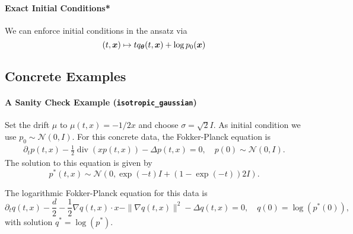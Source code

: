 \paragraph{Exact Initial Conditions*}
We can enforce initial conditions in the ansatz via 
\begin{equation*}
    (t,{\bm{x}}) \mapsto t q_{\bm{\theta}}(t, {\bm{x}}) + \log p_0({\bm{x}})
\end{equation*}

\subsection{Concrete Examples}
\paragraph{A Sanity Check Example (\texttt{isotropic\_gaussian})}
Set the drift $\mu$ to $\mu(t,x) = -1/2x$ and choose $\sigma=\sqrt 2 I$. As initial condition we use $p_0 \sim \mathcal N(0,I)$. For this concrete data, the Fokker-Planck equation is
\begin{align}\label{eq:fokker_planck_sanity_example}
    \partial_t p(t, x)
    -
    \frac12 \operatorname{div}(xp(t,x))
    -
    \Delta p(t,x)
    =
    0,
    \quad 
    p(0) \sim \mathcal N(0, I).
\end{align}
The solution to this equation is given by
\begin{equation}
    p^*(t, x) \sim \mathcal N(0, \exp(-t)I + (1 - \exp(-t)) 2 I).
\end{equation}

The logarithmic Fokker-Planck equation for this data is 
\begin{equation}
    \partial_t q(t,x)
    -
    \frac d2
    -
    \frac12\nabla q(t,x)\cdot x
    -
    \| \nabla q(t,x) \|^2
    -
    \Delta q(t,x)
    =
    0,
    \quad 
    q(0) = \log(p^*(0)),
\end{equation}
with solution $q^* = \log(p^*)$.

